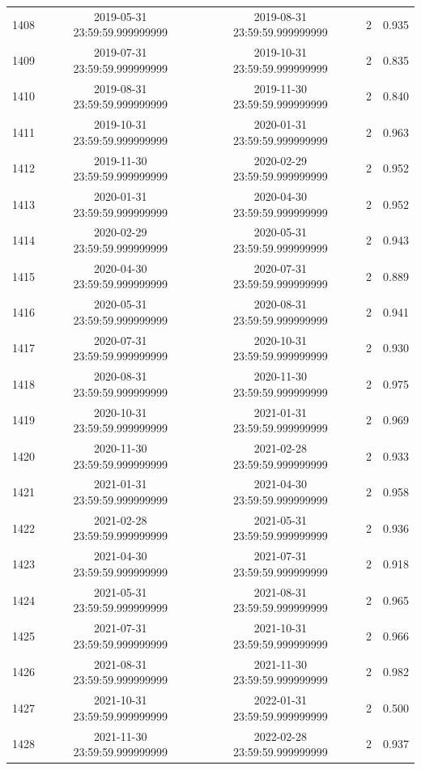 \begin{table}
\begin{tabular}{lcccc}
1408 & 2019-05-31 23:59:59.999999999 & 2019-08-31 23:59:59.999999999 & 2 & 0.935 \\
1409 & 2019-07-31 23:59:59.999999999 & 2019-10-31 23:59:59.999999999 & 2 & 0.835 \\
1410 & 2019-08-31 23:59:59.999999999 & 2019-11-30 23:59:59.999999999 & 2 & 0.840 \\
1411 & 2019-10-31 23:59:59.999999999 & 2020-01-31 23:59:59.999999999 & 2 & 0.963 \\
1412 & 2019-11-30 23:59:59.999999999 & 2020-02-29 23:59:59.999999999 & 2 & 0.952 \\
1413 & 2020-01-31 23:59:59.999999999 & 2020-04-30 23:59:59.999999999 & 2 & 0.952 \\
1414 & 2020-02-29 23:59:59.999999999 & 2020-05-31 23:59:59.999999999 & 2 & 0.943 \\
1415 & 2020-04-30 23:59:59.999999999 & 2020-07-31 23:59:59.999999999 & 2 & 0.889 \\
1416 & 2020-05-31 23:59:59.999999999 & 2020-08-31 23:59:59.999999999 & 2 & 0.941 \\
1417 & 2020-07-31 23:59:59.999999999 & 2020-10-31 23:59:59.999999999 & 2 & 0.930 \\
1418 & 2020-08-31 23:59:59.999999999 & 2020-11-30 23:59:59.999999999 & 2 & 0.975 \\
1419 & 2020-10-31 23:59:59.999999999 & 2021-01-31 23:59:59.999999999 & 2 & 0.969 \\
1420 & 2020-11-30 23:59:59.999999999 & 2021-02-28 23:59:59.999999999 & 2 & 0.933 \\
1421 & 2021-01-31 23:59:59.999999999 & 2021-04-30 23:59:59.999999999 & 2 & 0.958 \\
1422 & 2021-02-28 23:59:59.999999999 & 2021-05-31 23:59:59.999999999 & 2 & 0.936 \\
1423 & 2021-04-30 23:59:59.999999999 & 2021-07-31 23:59:59.999999999 & 2 & 0.918 \\
1424 & 2021-05-31 23:59:59.999999999 & 2021-08-31 23:59:59.999999999 & 2 & 0.965 \\
1425 & 2021-07-31 23:59:59.999999999 & 2021-10-31 23:59:59.999999999 & 2 & 0.966 \\
1426 & 2021-08-31 23:59:59.999999999 & 2021-11-30 23:59:59.999999999 & 2 & 0.982 \\
1427 & 2021-10-31 23:59:59.999999999 & 2022-01-31 23:59:59.999999999 & 2 & 0.500 \\
1428 & 2021-11-30 23:59:59.999999999 & 2022-02-28 23:59:59.999999999 & 2 & 0.937 \\

\end{tabular}
\end{table}
